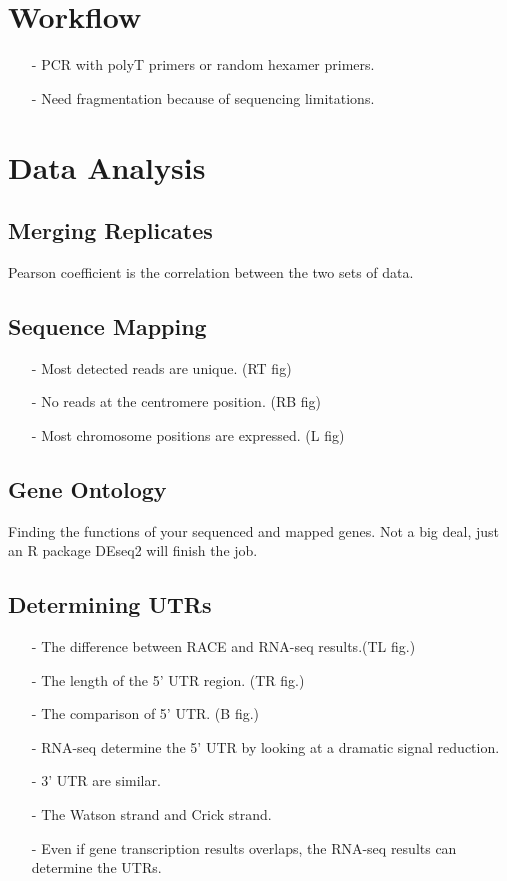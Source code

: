 \documentclass[12pt]{article}
\begin{document}
{	\section{Workflow}
	\begin{itemize}
		\item [-]PCR with polyT primers or random hexamer primers.
		\item [-]Need fragmentation because of sequencing limitations.
	\end{itemize}
	
	\section{Data Analysis}
	
	\subsection{Merging Replicates}
	Pearson coefficient is the correlation between the two sets of data.
	
	\subsection{Sequence Mapping}
	\begin{itemize}
		\item [-]Most detected reads are unique. (RT fig)
		\item [-]No reads at the centromere position. (RB fig)
		\item [-]Most chromosome positions are expressed. (L fig)
	\end{itemize}
	
	\subsection{Gene Ontology}
	Finding the functions of your sequenced and mapped genes. Not a big deal, just an R package DEseq2 will finish the job.
	
	\subsection{Determining UTRs}
	\begin{itemize}
		\item [-]The difference between RACE and RNA-seq results.(TL fig.)
		\item [-]The length of the 5' UTR region. (TR fig.)
		\item [-]The comparison of 5' UTR. (B fig.)
		\item [-]RNA-seq determine the 5' UTR by looking at a dramatic signal reduction.
		\item [-]3' UTR are similar.
		\item [-]The Watson strand and Crick strand.
		\item [-]Even if gene transcription results overlaps, the RNA-seq results can determine the UTRs.
	\end{itemize}
	
}
\end{document}
